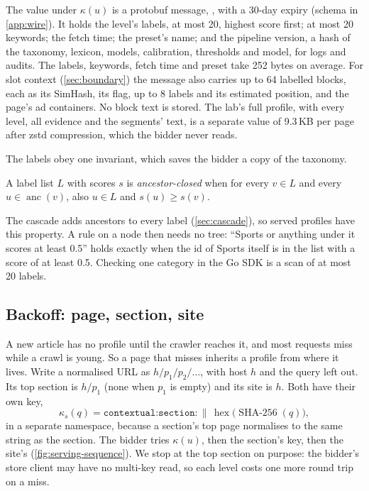 The value under $\kappa(u)$ is a protobuf message, , with a
30-day expiry (schema in \cref{app:wire}). It holds the  level's
labels, at most 20, highest score first; at most 20 keywords; the fetch time;
the preset's name; and the pipeline version, a hash of the taxonomy, lexicon,
models, calibration, thresholds and  model, for logs and audits. The labels,
keywords, fetch time and preset take 252 bytes on average. For slot context
(\cref{sec:boundary}) the message also carries up to 64 labelled blocks, each
as its SimHash, its  flag, up to 8 labels and its estimated
position, and the page's ad containers. No block text is stored. The lab's full
profile, with every level, all evidence and the segments' text, is a separate
value of 9.3\,KB per page after zstd compression, which the bidder never
reads.

The labels obey one invariant, which saves the bidder a copy of the taxonomy.

\begin{definition}\label{def:serving-closed}
A label list $L$ with scores $s$ is \emph{ancestor-closed} when for every
$v \in L$ and every $u \in \operatorname{anc}(v)$, also $u \in L$ and
$s(u) \ge s(v)$.
\end{definition}

The cascade adds ancestors to every label (\cref{sec:cascade}), so served
profiles have this property. A rule on a node then needs no tree: ``Sports or
anything under it scores at least 0.5'' holds exactly when the id of Sports
itself is in the list with a score of at least 0.5. Checking one category
in the Go SDK is a scan of at most 20 labels.

\subsection{Backoff: page, section, site}\label{sec:serving-backoff}

A new article has no profile until the crawler reaches it, and most requests
miss while a crawl is young. So a page that misses inherits a profile from
where it lives. Write a normalised URL as $h/p_1/p_2/\dots$, with host $h$ and
the query left out. Its top section is $h/p_1$ (none when $p_1$ is empty) and
its site is $h$. Both have their own key,
\begin{equation}\label{eq:serving-section-key}
\kappa_s(q) = \texttt{contextual:section:} \,\|\, \operatorname{hex}\bigl(\operatorname{SHA\text{-}256}(q)\bigr),
\end{equation}
in a separate namespace, because a section's top page normalises to the same
string as the section. The bidder tries $\kappa(u)$, then the section's key,
then the site's (\cref{fig:serving-sequence}). We stop at the top section on
purpose: the bidder's store client may have no multi-key read, so each level
costs one more round trip on a miss.

